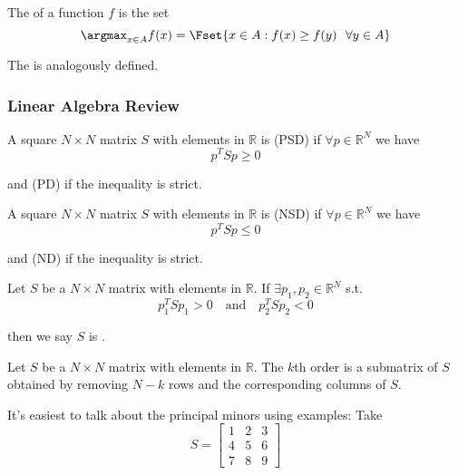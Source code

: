 \documentclass{article}
\begin{document}
\begin{definition}
  The \keyword{$\argmax$} of a function $f$ is the set
  \[
    \argmax_{x \in A} f(x) = \Fset{x \in A: f(x) \ge f(y) ~~ \forall y \in A}
  \]

  The \keyword{$\argmin$} is analogously defined.
\end{definition}

\subsubsection{Linear Algebra Review}
\label{ssub:linear_algebra_review}

\begin{definition}
  A square $N \times N$ matrix $S$ with elements in $\mathbb{R}$ is  (PSD) if $\forall p \in \mathbb{R}^N$ we have
  \[
    p^T S p \ge 0
  \]

  and  (PD) if the inequality is strict.
\end{definition}

\begin{definition}
  A square $N \times N$ matrix $S$ with elements in $\mathbb{R}$ is  (NSD) if $\forall p \in \mathbb{R}^N$ we have
  \[
    p^T S p \le 0
  \]

  and  (ND) if the inequality is strict.
\end{definition}

\begin{definition}
  Let $S$ be a $N \times N$ matrix with elements in $\mathbb{R}$. If $\exists p_1, p_2 \in \mathbb{R}^N$ s.t.
  \[
    p_1^T S p_1 > 0
    \quad
    \text{and}
    \quad
    p_2^T S p_2 < 0
  \]

  then we say $S$ is .
\end{definition}

\begin{definition}
  Let $S$ be a $N \times N$ matrix with elements in $\mathbb{R}$. The $k$th order  is a submatrix of $S$ obtained by removing $N - k$ rows and the corresponding columns of $S$.
\end{definition}

It's easiest to talk about the principal minors using examples: Take
\[
  S = \left[\begin{matrix}
    1 & 2 & 3 \\
    4 & 5 & 6 \\
    7 & 8 & 9
  \end{matrix}\right]
\]
\end{document}
